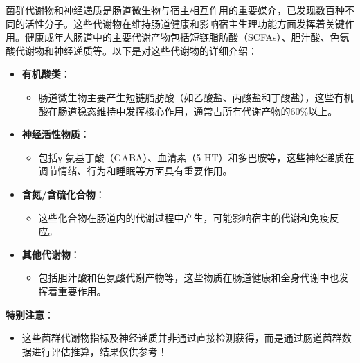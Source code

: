 \documentclass[UTF8]{ctexart}
\begin{document}
\begin{tcolorbox}[
    enhanced,
    colback=customTealBg,
    colframe=customTealBg,
    arc=3mm,
    boxrule=0pt,
    width=\textwidth,
    top=8pt,
    bottom=8pt
]
{\small{\color{customTeal}\faInfoCircle} 菌群代谢物和神经递质是肠道微生物与宿主相互作用的重要媒介，已发现数百种不同的活性分子。这些代谢物在维持肠道健康和影响宿主生理功能方面发挥着关键作用。健康成年人肠道中的主要代谢产物包括短链脂肪酸（SCFAs）、胆汁酸、色氨酸代谢物和神经递质等。以下是对这些代谢物的详细介绍：

\begin{itemize}
    \item \textbf{有机酸类}：
    \begin{itemize}
        \item 肠道微生物主要产生短链脂肪酸（如乙酸盐、丙酸盐和丁酸盐），这些有机酸在肠道稳态维持中发挥核心作用，通常占所有代谢产物的60\%以上。
    \end{itemize}
    \item \textbf{神经活性物质}：
    \begin{itemize}
        \item 包括γ-氨基丁酸（GABA）、血清素（5-HT）和多巴胺等，这些神经递质在调节情绪、行为和睡眠等方面具有重要作用。
    \end{itemize}
    \item \textbf{含氮/含硫化合物}：
    \begin{itemize}
        \item 这些化合物在肠道内的代谢过程中产生，可能影响宿主的代谢和免疫反应。
    \end{itemize}
    \item \textbf{其他代谢物}：
    \begin{itemize}
        \item 包括胆汁酸和色氨酸代谢产物等，这些物质在肠道健康和全身代谢中也发挥着重要作用。
    \end{itemize}
\end{itemize}

{\color{orange}\faExclamationTriangle} \textbf{特别注意}：
\begin{itemize}
    \item 这些菌群代谢物指标及神经递质并非通过直接检测获得，而是通过肠道菌群数据进行评估推算，结果仅供参考！
\end{itemize}
}
\end{tcolorbox}
\end{document}

